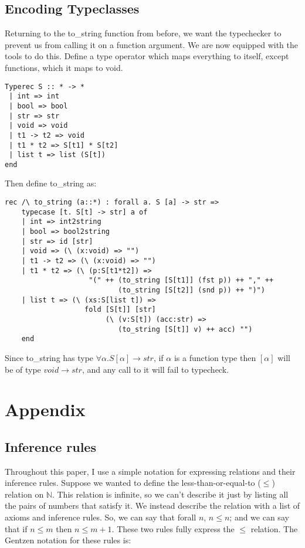 \documentclass[pageno]{jpaper}
\begin{document}
{{{\subsection{Encoding Typeclasses}
Returning to the to_string function from before, we want the typechecker to prevent us from calling
it on a function argument. We are now equipped with the tools to do this.
Define a type operator which maps everything to itself, except functions, which it maps to void.
\begin{lstlisting}
Typerec S :: * -> *
 | int => int
 | bool => bool
 | str => str
 | void => void
 | t1 -> t2 => void
 | t1 * t2 => S[t1] * S[t2]
 | list t => list (S[t])
end
\end{lstlisting}

Then define to_string as:

\begin{lstlisting}[mathescape]
rec /\ to_string (a::*) : forall a. S [a] -> str =>
    typecase [t. S[t] -> str] a of
    | int => int2string
    | bool => bool2string
    | str => id [str]
    | void => (\ (x:void) => "")
    | t1 -> t2 => (\ (x:void) => "")
    | t1 * t2 => (\ (p:S[t1*t2]) => 
                    "(" ++ (to_string [S[t1]] (fst p)) ++ "," ++
                           (to_string [S[t2]] (snd p)) ++ ")")
    | list t => (\ (xs:S[list t]) =>
                   fold [S[t]] [str] 
                        (\ (v:S[t]) (acc:str) =>
                           (to_string [S[t]] v) ++ acc) "")
    end
\end{lstlisting}

Since to_string has type $\forall \alpha. S[\alpha] \rightarrow str$, if $\alpha$ is a function type then
$[\alpha]$ will be of type $void \rightarrow str$, and any call to it will fail to typecheck.

\appendix
\section{Appendix}
\subsection{Inference rules}
Throughout this paper, I use a simple notation for expressing relations and their inference rules.
Suppose we wanted to define the less-than-or-equal-to ($\leq$) relation on $\mathbb{N}$.
This relation is infinite,
so we can't describe it just by listing all the pairs of numbers that satisfy it.
We instead describe the relation with a list of axioms and inference rules. So, we can say that
forall $n$, $n \leq n$; and we can say that if $n \leq m$ then $n \leq m+1$. These two rules fully express the $\leq$ relation.
The Gentzen notation for these rules is:

}}}
\end{document}
